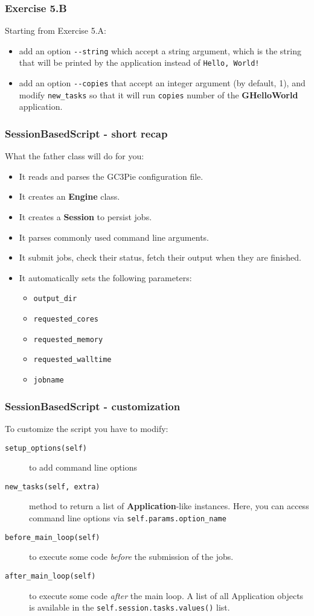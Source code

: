 \documentclass[english,serif,mathserif,xcolor=pdftex,dvipsnames,table]{beamer}
\begin{document}
\begin{frame}[fragile]
  \frametitle{Exercise 5.B}
  Starting from Exercise 5.A:
  \begin{itemize}
  \item add an option \lstinline|--string| which accept a string
    argument, which is the string that will be
    printed by the application instead of \texttt{Hello, World!}
  \item add an option \lstinline|--copies| that accept an integer
    argument (by default, 1), and modify \lstinline|new_tasks| so that
    it will run \lstinline|copies| number of the \textbf{GHelloWorld} application.
  \end{itemize}
\end{frame}


\begin{frame}
  \frametitle{SessionBasedScript - short recap}
  What the father class will do for you:
  \begin{itemize}
  \item It reads and parses the GC3Pie configuration file.
  \item It creates an \textbf{Engine} class.
  \item It creates a \textbf{Session} to persist jobs.
  \item It parses commonly used command line arguments.
  \item It submit jobs, check their status, fetch their output when
    they are finished.
  \item It automatically sets the following parameters:
    \begin{itemize}
    \item \lstinline|output_dir|
    \item \lstinline|requested_cores|
    \item \lstinline|requested_memory|
    \item \lstinline|requested_walltime|
    \item \lstinline|jobname|
    \end{itemize}

  \end{itemize}
\end{frame}


\begin{frame}
  \frametitle{SessionBasedScript - customization}
To customize the script you have to modify:
\begin{description}
\item [\texttt{setup\_options(self)}] to add command line options
\item [\texttt{new\_tasks(self, extra)}] method to return a list of
  \textbf{Application}-like instances. Here, you can access command
  line options via \lstinline|self.params.option_name|
\item [\texttt{before\_main\_loop(self)}] to execute some code
  \emph{before} the submission of the jobs.
\item [\texttt{after\_main\_loop(self)}] to execute some code
  \emph{after} the main loop. A list of all Application objects is
  available in the \lstinline|self.session.tasks.values()| list.
\end{description}
\end{frame}
\end{document}
